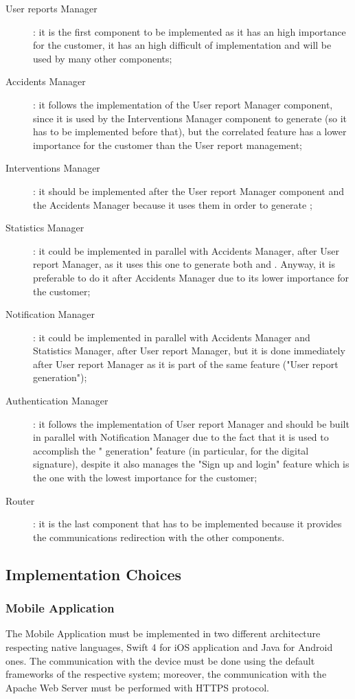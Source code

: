 \documentclass[../DD.tex]{subfiles}
\begin{document}
\begin{description}
	\item[User reports Manager]: it is the first component to be implemented as it has an high importance for the customer, it has an high difficult of implementation and will be used by many other components;
	\item[Accidents Manager]: it follows the implementation of the User report Manager component, since it is used by the Interventions Manager component to generate  (so it has to be implemented before that), but the correlated feature has a lower importance for the customer than the User report management;
	\item[Interventions Manager]: it should be implemented after the User report Manager component and the Accidents Manager because it uses them in order to generate ;
	\item[Statistics Manager]: it could be implemented in parallel with Accidents Manager, after User report Manager, as it uses this one to generate both  and . Anyway, it is preferable to do it after Accidents Manager due to its lower importance for the customer;
	\item[Notification Manager]: it could be implemented in parallel with Accidents Manager and Statistics Manager, after User report Manager, but it is done immediately after User report Manager as it is part of the same feature ("User report generation");
	\item[Authentication Manager]: it follows the implementation of User report Manager and should be built in parallel with Notification Manager due to the fact that it is used to accomplish the " generation" feature (in particular, for the digital signature), despite it also manages the "Sign up and login" feature which is the one with the lowest importance for the customer;
	\item[Router]: it is the last component that has to be implemented because it provides the communications redirection with the other components.
	
\end{description}


\subsection{Implementation Choices\label{5.2.2}}

\subsubsection{Mobile Application}
The Mobile Application must be implemented in two different architecture respecting native languages, Swift 4 for iOS application and Java for Android ones. The communication with the device must be done using the default frameworks of the respective system; moreover, the communication with the Apache Web Server must be performed with HTTPS protocol.
\end{document}

